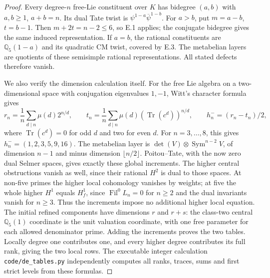 \begin{proof}
Every degree-\(n\) free-Lie constituent over \(K\)
has bidegree \((a,b)\) with \(a,b\ge1\), \(a+b=n\).
Its dual Tate twist is
\(\psi^{1-a}\overline\psi^{1-b}\).
For \(a>b\), put \(m=a-b\), \(t=b-1\).
Then \(m+2t=n-2\le6\), so E.1 applies; the
conjugate bidegree gives the same induced
representation. If \(a=b\), the rational
constituents are \(\mathbb Q_5(1-a)\) and its
quadratic CM twist, covered by E.3. The
metabelian layers are quotients of these
semisimple rational representations. All
stated defects therefore vanish.

We also verify the dimension calculation itself.
For the free Lie algebra on a two-dimensional
space with conjugation eigenvalues \(1,-1\),
Witt's character formula gives
\[
 r_n=\frac1n\sum_{d\mid n}\mu(d)2^{n/d},\qquad
 t_n=\frac1n\sum_{d\mid n}\mu(d)
          (\operatorname{Tr}(c^d))^{n/d},\qquad
 h_n^-=(r_n-t_n)/2,
\]
where \(\operatorname{Tr}(c^d)=0\) for odd \(d\)
and two for even \(d\).
For \(n=3,\ldots,8\), this gives
\(h_n^-=(1,2,3,5,9,16)\).
The metabelian layer is
\(\det(V)\otimes\operatorname{Sym}^{n-2}V\),
of dimension \(n-1\) and minus dimension
\(\lfloor n/2\rfloor\).
Poitou--Tate, with the now zero dual Selmer
spaces, gives exactly these global increments.
The higher central obstructions vanish as
well, since their rational \(H^2\) is dual
to those spaces. At non-five primes the
higher local cohomology vanishes by weights;
at five the whole higher \(H^1\) equals \(H_f^1\),
since \(\operatorname{Fil}^0L_n=0\) for
\(n\ge2\) and the dual invariants vanish
for \(n\ge3\). Thus the increments impose
no additional higher local equation.
The initial refined components have dimensions
\(r\) and \(r+s\): the class-two central
\(\mathbb Q_5(1)\) coordinate is the unit
valuation coordinate, with one free
parameter for each allowed denominator
prime. Adding the increments proves the
two tables. Locally degree one contributes
one, and every higher degree contributes
its full rank, giving the two local rows.
The executable integer calculation
\texttt{code/de\_tables.py} independently
computes all ranks, traces, sums and first
strict levels from these formulas.
\end{proof}
